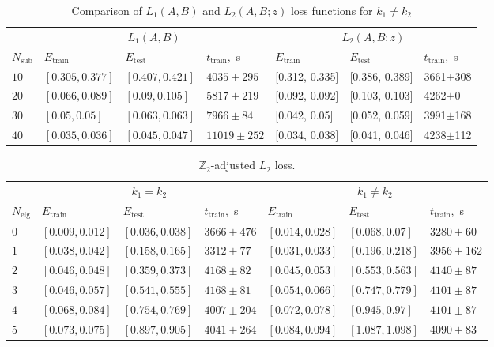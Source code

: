 \documentclass{article}
\begin{document}
\begin{table}[b!]
\caption{Comparison of $L_1(A, B)$ and $L_2(A, B; z)$ loss functions for $k_{1}\neq k_{2}$}
\label{a1_neq_a2_loss_comparison}
\begin{center}
\hspace*{-0.5cm}  
\begin{tabular}{lllllll}
\toprule
& \multicolumn{3}{c}{$L_1(A, B)$} &  \multicolumn{3}{c}{$L_2(A, B; z)$}\\
\cmidrule(r){2-4}\cmidrule(r){5-7}
$N_{\text{sub}}$ & $E_{\text{train}}$ & $E_{\text{test}}$ & $t_{\text{train}},$ s & $E_{\text{train}}$ & $E_{\text{test}}$ & $t_{\text{train}},$ s \\
\midrule
$10$ & $[0.305, 0.377]$ & $[0.407, 0.421]$ & $4035\pm295$ & [0.312, 0.335] & [0.386, 0.389] & 3661$\pm$308 \\
$20$ & $[0.066, 0.089]$ & $[0.09, 0.105]$ & $5817\pm219$ & [0.092, 0.092] & [0.103, 0.103] & 4262$\pm0$ \\
$30$ & $[0.05, 0.05]$ & $[0.063, 0.063]$ & $7966\pm84$ & [0.042, 0.05] & [0.052, 0.059] & 3991$\pm$168 \\
$40$ & $[0.035, 0.036]$ & $[0.045, 0.047]$ & $11019\pm252$ & [0.034, 0.038] & [0.041, 0.046] & 4238$\pm$112 \\
\bottomrule
\end{tabular}
\end{center}
\end{table}

\begin{table}[b!]
\caption{$\mathbb{Z}_2$-adjusted $L_2$ loss.}
\label{z2_l2_loss}
\begin{center}
\hspace*{-0.5cm}  
\begin{tabular}{lllllll}
\toprule
& \multicolumn{3}{c}{$k_1=k_2$} &  \multicolumn{3}{c}{$k_1\neq k_2$}\\
\cmidrule(r){2-4}\cmidrule(r){5-7}
$N_{\text{eig}}$ & $E_{\text{train}}$ & $E_{\text{test}}$ & $t_{\text{train}},$ s & $E_{\text{train}}$ & $E_{\text{test}}$ & $t_{\text{train}},$ s \\
\midrule
$0$ & $[0.009, 0.012]$ & $[0.036, 0.038]$ & $3666\pm476$ & $[0.014, 0.028]$ & $[0.068, 0.07]$ & $3280\pm60$ \\
$1$ & $[0.038, 0.042]$ & $[0.158, 0.165]$ & $3312\pm77$ & $[0.031, 0.033]$ & $[0.196, 0.218]$ & $3956\pm162$ \\
$2$ & $[0.046, 0.048]$ & $[0.359, 0.373]$ & $4168\pm82$ & $[0.045, 0.053]$ & $[0.553, 0.563]$ & $4140\pm87$ \\
$3$ & $[0.046, 0.057]$ & $[0.541, 0.555]$ & $4168\pm81$ & $[0.054, 0.066]$ & $[0.747, 0.779]$ & $4101\pm87$ \\
$4$ & $[0.068, 0.084]$ & $[0.754, 0.769]$ & $4007\pm204$ & $[0.072, 0.078]$ & $[0.945, 0.97]$ & $4101\pm87$ \\
$5$ & $[0.073, 0.075]$ & $[0.897, 0.905]$ & $4041\pm264$ & $[0.084, 0.094]$ & $[1.087, 1.098]$ & $4090\pm83$ \\
\bottomrule
\end{tabular}
\end{center}
\end{table}
\end{document}
